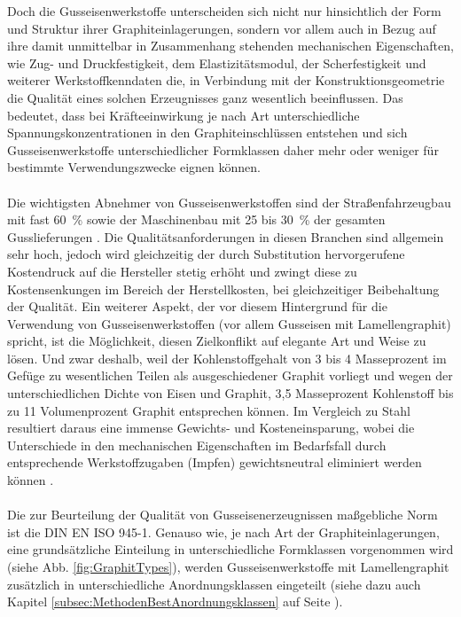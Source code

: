 \documentclass[
fontsize=10pt, 
listof = totoc,
parskip = half	
]{report}
\begin{document}
\noindent Doch die Gusseisenwerkstoffe unterscheiden sich nicht nur hinsichtlich der Form und Struktur ihrer Graphiteinlagerungen, sondern vor allem auch in Bezug auf ihre damit unmittelbar in Zusammenhang stehenden mechanischen Eigenschaften, wie Zug- und Druckfestigkeit, dem Elastizitätsmodul, der Scherfestigkeit und weiterer Werkstoffkenndaten die, in Verbindung mit der Konstruktionsgeometrie die Qualität eines solchen Erzeugnisses ganz wesentlich beeinflussen. Das bedeutet, dass bei Kräfteeinwirkung je nach Art unterschiedliche Spannungskonzentrationen in den Graphiteinschlüssen entstehen und sich Gusseisenwerkstoffe unterschiedlicher Formklassen daher mehr oder weniger für bestimmte Verwendungszwecke eignen können. 
\\\\
\noindent Die wichtigsten Abnehmer von Gusseisenwerkstoffen sind der Straßenfahrzeugbau mit fast 60~\% sowie der Maschinenbau mit 25 bis 30~\% der gesamten Gusslieferungen \cite{BDGuss01}. Die Qualitätsanforderungen in diesen Branchen sind allgemein sehr hoch, jedoch wird gleichzeitig der  durch Substitution hervorgerufene Kostendruck auf die Hersteller stetig erhöht und zwingt diese zu Kostensenkungen im Bereich der Herstellkosten, bei gleichzeitiger Beibehaltung der Qualität. Ein weiterer Aspekt, der vor diesem Hintergrund für die Verwendung von Gusseisenwerkstoffen (vor allem Gusseisen mit Lamellengraphit) spricht, ist die Möglichkeit, diesen Zielkonflikt auf elegante Art und Weise zu lösen. Und zwar deshalb, weil der Kohlenstoffgehalt von 3 bis 4 Masseprozent im Gefüge zu wesentlichen Teilen als ausgeschiedener Graphit vorliegt und wegen der unterschiedlichen Dichte von Eisen und Graphit, 3,5 Masseprozent Kohlenstoff bis zu 11 Volumenprozent Graphit entsprechen können. Im Vergleich zu Stahl resultiert daraus eine immense Gewichts- und Kosteneinsparung, wobei die Unterschiede in den mechanischen Eigenschaften im Bedarfsfall durch entsprechende Werkstoffzugaben (Impfen) gewichtsneutral eliminiert werden können \cite{BDGuss02}.
\\\\
Die zur Beurteilung der Qualität von Gusseisenerzeugnissen maßgebliche Norm ist die DIN EN ISO 945-1. Genauso wie, je nach Art der Graphiteinlagerungen, eine grundsätzliche Einteilung in unterschiedliche Formklassen vorgenommen wird (siehe Abb. \ref{fig:GraphitTypes}), werden Gusseisenwerkstoffe mit Lamellengraphit zusätzlich in unterschiedliche Anordnungsklassen eingeteilt (siehe dazu auch Kapitel \ref{subsec:MethodenBestAnordnungsklassen} auf Seite \pageref{subsec:MethodenBestAnordnungsklassen}).
\end{document}
